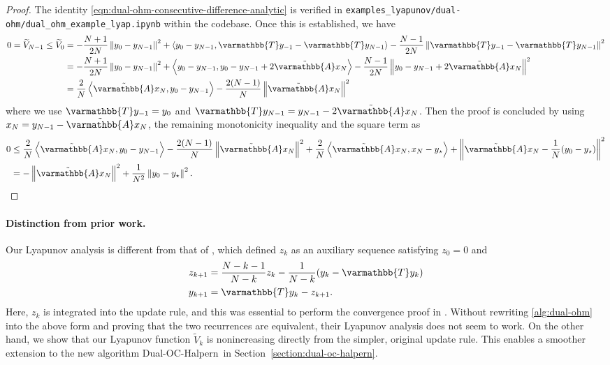\documentclass{article}
\theoremstyle{definition}
\theoremstyle{plain}
\newcommand{\opA}{{\varmathbb{A}}}
\newcommand{\opT}{{\varmathbb{T}}}
\newcommand{\inprod}[2]{\left\langle #1,#2 \right\rangle}
\newcommand{\sqnorm}[1]{\left\| #1 \right\|^2}
\newcommand{\topa}{\tilde{\opA}}
\newcommand{\dualoc}{Dual-OC-Halpern}
\begin{document}
\begin{proof}
The identity \eqref{eqn:dual-ohm-consecutive-difference-analytic} is verified in \texttt{examples\_lyapunov/dual-ohm/dual\_ohm\_example\_lyap.ipynb} within the codebase. 
Once this is established, we have
\begin{align*}
    0 = \widetilde{V}_{N-1} \le \widetilde{V}_0 & = -\frac{N+1}{2N} \sqnorm{y_0 - y_{N-1}} + \inprod{y_0 - y_{N-1}}{\opT y_{-1} - \opT y_{N-1}} - \frac{N-1}{2N} \sqnorm{\opT y_{-1} - \opT y_{N-1}} \\
    & = -\frac{N+1}{2N} \sqnorm{y_0 - y_{N-1}} + \inprod{y_0 - y_{N-1}}{y_0 - y_{N-1} + 2\topa x_N} - \frac{N-1}{2N} \sqnorm{y_0 - y_{N-1} + 2\topa x_N} \\
    & = \frac{2}{N} \inprod{\topa x_N}{y_0 - y_{N-1}} - \frac{2(N-1)}{N} \sqnorm{\topa x_N} 
\end{align*}
where we use $\opT y_{-1} = y_0$ and $\opT y_{N-1} = y_{N-1} - 2\topa x_N$.
Then the proof is concluded by using $x_N = y_{N-1} - \topa x_N$, the remaining monotonicity inequality and the square term as
\begin{align*}
    0 & \le \frac{2}{N} \inprod{\topa x_N}{y_0 - y_{N-1}} - \frac{2(N-1)}{N} \sqnorm{\topa x_N} + \frac{2}{N} \inprod{\topa  x_N}{x_N - y_\star} + \sqnorm{\topa x_N - \frac{1}{N}(y_0 - y_\star)} \\
    & = -\sqnorm{\topa x_N} + \frac{1}{N^2} \sqnorm{y_0 - y_\star} .
\end{align*}
\end{proof}

\paragraph{Distinction from prior work.} 
Our Lyapunov analysis is different from that of \citep{YoonKimSuhRyu2024_optimal}, which defined $z_k$ as an auxiliary sequence satisfying $z_0 = 0$ and 
\begin{align*}
    z_{k+1} & = \frac{N-k-1}{N-k} z_k - \frac{1}{N-k} (y_k - \opT y_k) \\
    y_{k+1} & = \opT y_k - z_{k+1} .
\end{align*}
Here, $z_k$ is integrated into the update rule, and this was essential to perform the convergence proof in \citep{YoonKimSuhRyu2024_optimal}.
Without rewriting \ref{alg:dual-ohm} into the above form and proving that the two recurrences are equivalent, their Lyapunov analysis does not seem to work.
On the other hand, we show that our Lyapunov function $\widetilde{V}_k$ is nonincreasing directly from the simpler, original update rule.
This enables a smoother extension to the new algorithm \dualoc~in Section~\ref{section:dual-oc-halpern}.
\end{document}
